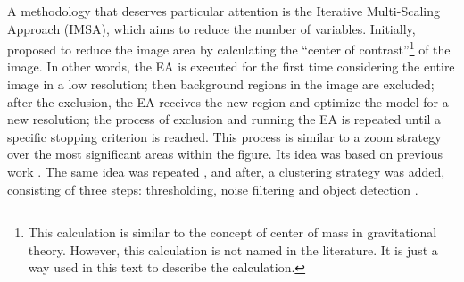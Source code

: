 			A methodology that deserves particular attention is the Iterative Multi-Scaling Approach (IMSA), which aims to reduce the number of variables. Initially, \cite{caorsi2002iterative} proposed to reduce the image area by calculating the ``center of contrast''\footnote{This calculation is similar to the concept of center of mass in gravitational theory. However, this calculation is not named in the literature. It is just a way used in this text to describe the calculation.} of the image. In other words, the EA is executed for the first time considering the entire image in a low resolution; then background regions in the image are excluded; after the exclusion, the EA receives the new region and optimize the model for a new resolution; the process of exclusion and running the EA is repeated until a specific stopping criterion is reached. This process is similar to a zoom strategy over the most significant areas within the figure. Its idea was based on previous work \citep{miller1996multiscale,miller1996wavelet}. The same idea was repeated \citep{caorsi2003new}, and after, a clustering strategy was added, consisting of three steps: thresholding, noise filtering and object detection \citep{caorsi2004detection}.
			
